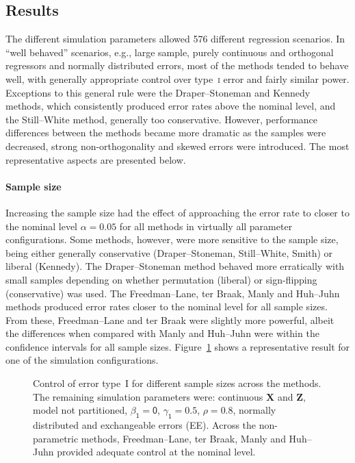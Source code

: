 \subsection{Results}

The different simulation parameters allowed 576 different regression scenarios. In ``well behaved'' scenarios, e.g., large sample, purely continuous and orthogonal regressors and normally distributed errors, most of the methods tended to behave well, with generally appropriate control over type~\textsc{i} error and fairly similar power. Exceptions to this general rule were the Draper--Stoneman and Kennedy methods, which consistently produced error rates above the nominal level, and the Still--White method, generally too conservative. However, performance differences between the methods became more dramatic as the samples were decreased, strong non-orthogonality and skewed errors were introduced. The most representative aspects are presented below.

\paragraph{Sample size} Increasing the sample size had the effect of approaching the error rate to closer to the nominal level $\alpha=0.05$ for all methods in virtually all parameter configurations. Some methods, however, were more sensitive to the sample size, being either generally conservative (Draper--Stoneman, Still--White, Smith) or liberal (Kennedy). The Draper--Stoneman meth\-od behaved more erratically with small samples depending on whether permutation (liberal) or sign-flipping (conservative) was used. The Freedman--Lane, ter Braak, Manly and Huh--Juhn methods produced error rates closer to the nominal level for all sample sizes. From these, Freedman--Lane and ter Braak were slightly more powerful, albeit the differences when compared with Manly and Huh--Juhn were within the confidence intervals for all sample sizes. Figure~\ref{fig:simulations-ne} shows a representative result for one of the simulation configurations.

\begin{figure}[!p]
\centering
\caption{Control of error type~I for different sample sizes across the methods. The remaining simulation parameters were: continuous $\mathbf{X}$ and $\mathbf{Z}$, model not partitioned, $\mathsf{\beta_1=0}$, $\mathsf{\gamma_1=0.5}$, $\mathsf{\rho=0.8}$, normally distributed and exchangeable errors ({\scriptsize EE}). Across the non-parametric methods, Freedman--Lane, ter Braak, Manly and Huh--Juhn provided adequate control at the nominal level.}
\label{fig:simulations-ne}
\end{figure}

